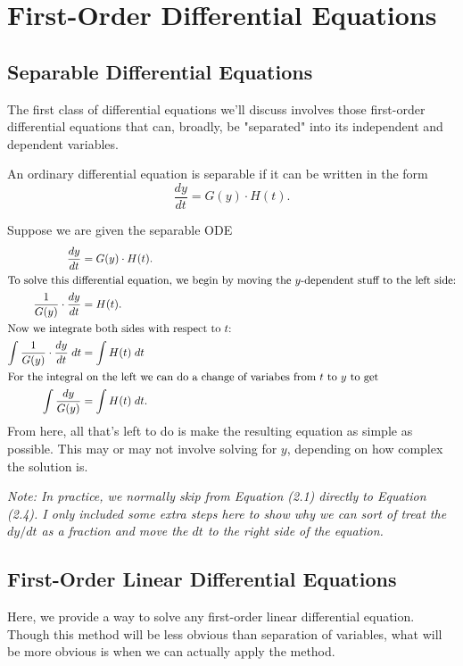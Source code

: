 \documentclass[../m082main.tex]{subfiles}
\begin{document}
\chapter{First-Order Differential Equations}

\section{Separable Differential Equations}
The first class of differential equations we'll discuss involves those first-order differential equations that can, broadly, be "separated" into its independent and dependent variables.

\begin{definition}
    An ordinary differential equation is separable if it can be written in the form
    \[ \frac{dy}{dt} = G(y) \cdot H(t). \]
\end{definition}

\begin{example}
    Suppose we are given the separable ODE
    \begin{align}
        \frac{dy}{dt} &= G(y) \cdot H(t). \\
        \intertext{To solve this differential equation, we begin by moving the $y$-dependent stuff to the left side:}
        \frac{1}{G(y)} \cdot \frac{dy}{dt} &= H(t). \\
        \intertext{Now we integrate both sides with respect to $t$:}
        \int \frac{1}{G(y)} \cdot \frac{dy}{dt} \;dt &= \int H(t) \;dt \\
        \intertext{For the integral on the left we can do a change of variabes from $t$ to $y$ to get}
        \int \frac{dy}{G(y)} &= \int H(t) \;dt.
    \end{align}
    From here, all that's left to do is make the resulting equation as simple as possible.
    This may or may not involve solving for $y$, depending on how complex the solution is.

    \medskip
    \textit{Note: In practice, we normally skip from Equation (2.1) directly to Equation (2.4).
    I only included some extra steps here to show why we can sort of treat the $dy/dt$ as a fraction and move the $dt$ to the right side of the equation.}
\end{example}

\section{First-Order Linear Differential Equations}
Here, we provide a way to solve any first-order linear differential equation.
Though this method will be less obvious than separation of variables, what will be more obvious is when we can actually apply the method.
\end{document}
